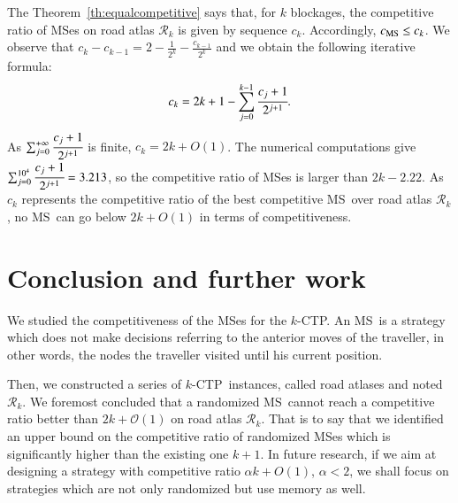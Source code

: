 \documentclass[preprint]{elsarticle}
\newcommand{\kctp}{$k$-CTP}
\newcommand{\mcalr}{\mathcal{R}}
\newcommand{\mts}{MS}
\newcommand{\cms}{c_{\mbox{\scriptsize{MS}}}}
\begin{document}
The Theorem~\ref{th:equalcompetitive} says that, for $k$ blockages, the competitive ratio of \mts es on road atlas $\mcalr_k$ is given by sequence $c_k$. Accordingly, $\cms \le c_k$.
We observe that $c_k - c_{k-1} = 2 - \frac{1}{2^{k}} - \frac{c_{k-1}}{2^{k}}$
and we obtain the following iterative formula:
\[
c_k = 2k+1-\sum_{j=0}^{k-1}\cfrac{c_j+1}{2^{j+1}}.
\]
As $\sum_{j=0}^{+\infty}\cfrac{c_j+1}{2^{j+1}}$ is finite, $c_k = 2k + O(1)$. The numerical computations give $\sum_{j=0}^{10^4}\cfrac{c_j+1}{2^{j+1}} = 3.213$, so the competitive ratio of \mts es is larger than $2k-2.22$. As $c_k$ represents the competitive ratio of the best competitive \mts ~over road atlas $\mcalr_k$, no \mts ~can go below $2k+O\left(1\right)$ in terms of competitiveness.
\section{Conclusion and further work} \label{sec:conclusion}

We studied the competitiveness of the \mts es for the \kctp. An \mts ~is a strategy which does not make decisions referring to the anterior moves of the traveller, in other words, the nodes the traveller visited until his current position.

Then, we constructed a series of \kctp ~instances, called road atlases and noted $\mcalr_k$. 
We foremost concluded that a randomized  \mts ~cannot reach a competitive ratio better than $2k+\mathcal{O}\left(1\right)$ on road atlas $\mcalr_k$. That is to say that we identified an upper bound on the competitive ratio of randomized \mts{}es which is significantly higher than the existing one $k+1$. In future research, if we aim at designing a strategy with competitive ratio $\alpha k + O\left(1\right)$, $\alpha < 2$, we shall focus on strategies which are not only randomized but use memory as well.



\end{document}
